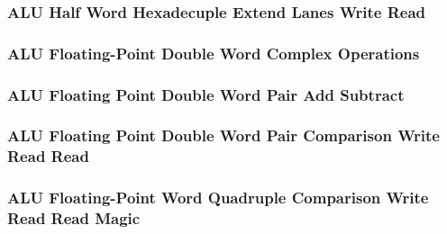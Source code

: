 \subsubsection[{\small ALU Half Word Hexadecuple Extend Lanes Write Read}]{ALU Half Word Hexadecuple Extend Lanes Write Read} \label{sec:format-ALU-BXEXTLWR}



\subsubsection[{\small ALU Floating-Point Double Word Complex Operations}]{ALU Floating-Point Double Word Complex Operations} \label{sec:format-ALU-FDCOP}



\subsubsection[{\small ALU Floating Point Double Word Pair Add Subtract}]{ALU Floating Point Double Word Pair Add Subtract} \label{sec:format-ALU-FDPADD}



\subsubsection[{\small ALU Floating Point Double Word Pair Comparison Write Read Read}]{ALU Floating Point Double Word Pair Comparison Write Read Read} \label{sec:format-ALU-FDPCWRR}



\subsubsection[{\small ALU Floating-Point Word Quadruple Comparison Write Read Read Magic}]{ALU Floating-Point Word Quadruple Comparison Write Read Read Magic} \label{sec:format-ALU-FDPCWRR.M}



